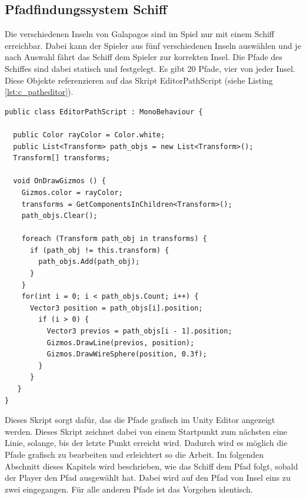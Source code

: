 		\subsection{Pfadfindungssystem Schiff}
			Die verschiedenen Inseln von Galapagos sind im Spiel nur mit einem Schiff erreichbar. Dabei kann der Spieler aus fünf verschiedenen Inseln auswählen und je nach Auswahl fährt das Schiff dem Spieler zur korrekten Insel. Die Pfade des Schiffes sind dabei statisch und festgelegt. Es gibt 20 Pfade, vier von jeder Insel. Diese Objekte referenzieren auf das Skript EditorPathScript (siehe Listing \ref{lst:c_patheditor}).

\begin{scriptsize}
\lstset{
	float,
	caption=Skript: EditorPathScript.cs, 
	language=[Sharp]C, 
	frame=single,  
	showstringspaces=false, 
	showspaces=false, 
	numbers=left, 
	captionpos=b, 
	belowcaptionskip=4pt,
	basicstyle=\ttfamily
} 
\begin{lstlisting}[label=lst:c_patheditor]
public class EditorPathScript : MonoBehaviour {

  public Color rayColor = Color.white;
  public List<Transform> path_objs = new List<Transform>();
  Transform[] transforms;

  void OnDrawGizmos () {
    Gizmos.color = rayColor;
    transforms = GetComponentsInChildren<Transform>();
    path_objs.Clear();

    foreach (Transform path_obj in transforms) {
      if (path_obj != this.transform) {
        path_objs.Add(path_obj);
      }
    }
    for(int i = 0; i < path_objs.Count; i++) {
      Vector3 position = path_objs[i].position;
        if (i > 0) {
          Vector3 previos = path_objs[i - 1].position;
          Gizmos.DrawLine(previos, position);
          Gizmos.DrawWireSphere(position, 0.3f);
        }
      }
   }
}
\end{lstlisting}
\end{scriptsize}

			Dieses Skript sorgt dafür, das die Pfade grafisch im Unity Editor angezeigt werden. Dieses Skript zeichnet dabei von einem Startpunkt zum nächsten eine Linie, solange, bis der letzte Punkt erreicht wird. Dadurch wird es möglich die Pfade grafisch zu bearbeiten und erleichtert so die Arbeit. Im folgenden Abschnitt dieses Kapitels wird beschrieben, wie das Schiff dem Pfad folgt, sobald der Player den Pfad ausgewählt hat. Dabei wird auf den Pfad von Insel eins zu zwei eingegangen. Für alle anderen Pfade ist das Vorgehen identisch.

